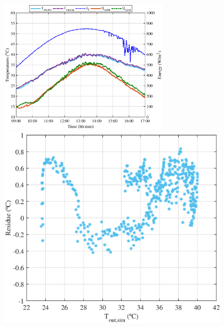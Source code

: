 \begin{figure}[ht!]
\begin{minipage}{0.60\columnwidth}
		\includegraphics[width=0.99\columnwidth,height=65mm]{figs/0115-3.eps}
	\end{minipage}
	\begin{minipage}{0.39\columnwidth}
		\includegraphics[scale=0.5,width=1.0\columnwidth]{figs/0115-residue-5.eps}

\end{minipage}
\end{figure}
